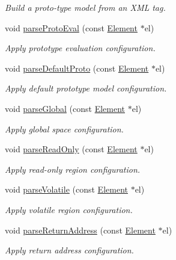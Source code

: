 \begin{DoxyCompactItemize}
\begin{DoxyCompactList}\small\item\em Build a proto-\/type model from an X\+ML tag. \end{DoxyCompactList}\item 
void \mbox{\hyperlink{class_architecture_a3e32daad5f4744f55c43f8acdd7ee8eb}{parse\+Proto\+Eval}} (const \mbox{\hyperlink{class_element}{Element}} $\ast$el)
\begin{DoxyCompactList}\small\item\em Apply prototype evaluation configuration. \end{DoxyCompactList}\item 
void \mbox{\hyperlink{class_architecture_a1ea36f2638d65351dd00ba06fe0dc00b}{parse\+Default\+Proto}} (const \mbox{\hyperlink{class_element}{Element}} $\ast$el)
\begin{DoxyCompactList}\small\item\em Apply default prototype model configuration. \end{DoxyCompactList}\item 
void \mbox{\hyperlink{class_architecture_a6348f797097deb07776eca437458ecc8}{parse\+Global}} (const \mbox{\hyperlink{class_element}{Element}} $\ast$el)
\begin{DoxyCompactList}\small\item\em Apply global space configuration. \end{DoxyCompactList}\item 
void \mbox{\hyperlink{class_architecture_a85374e24548406ae6497021150aa5d2c}{parse\+Read\+Only}} (const \mbox{\hyperlink{class_element}{Element}} $\ast$el)
\begin{DoxyCompactList}\small\item\em Apply read-\/only region configuration. \end{DoxyCompactList}\item 
void \mbox{\hyperlink{class_architecture_a90175b3753d44c818064e08425c57d97}{parse\+Volatile}} (const \mbox{\hyperlink{class_element}{Element}} $\ast$el)
\begin{DoxyCompactList}\small\item\em Apply volatile region configuration. \end{DoxyCompactList}\item 
void \mbox{\hyperlink{class_architecture_a24090e497ce6273f83bcb842be816ccb}{parse\+Return\+Address}} (const \mbox{\hyperlink{class_element}{Element}} $\ast$el)
\begin{DoxyCompactList}\small\item\em Apply return address configuration. \end{DoxyCompactList}\item 

\end{DoxyCompactItemize}
